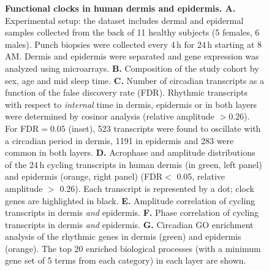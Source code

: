 {\begin{figure}
	\begin{center}
		\caption{\textbf{Functional clocks in human dermis and epidermis. A.} Experimental setup: the dataset includes dermal and epidermal samples collected from the back of 11 healthy subjects (5 females, 6 males). Punch biopsies were collected every 4\,h for 24\,h starting at 8\,AM. Dermis and epidermis were separated and gene expression was analyzed using microarrays.\textbf{ B. }Composition of the study cohort by sex, age and mid sleep time. \textbf{C. }Number of circadian transcripts as a function of the false discovery rate (FDR). Rhythmic transcripts with respect to \textit{internal} time in dermis, epidermis or in both layers were determined by cosinor analysis (relative amplitude $>0.26$). For FDR$=0.05$ (inset), 523 transcripts were found to oscillate with a circadian period in dermis, 1191 in epidermis and 283 were common in both layers. \textbf{D. }Acrophase and amplitude distributions of the 24\,h cycling transcripts in human dermis (in green, left panel) and epidermis (orange, right panel) (FDR$<$ 0.05, relative amplitude $>$ 0.26). Each transcript is represented by a dot; clock genes are highlighted in black. \textbf{E. }Amplitude correlation of cycling transcripts in dermis \textit{and} epidermis. \textbf{F. }Phase correlation of cycling transcripts in dermis \textit{and} epidermis. \textbf{G.} Circadian GO enrichment analysis of the rhythmic genes in dermis (green) and epidermis (orange). The top 20 enriched biological processes (with a minimum gene set of 5 terms from each category) in each layer are shown. } %
		\label{fig:fig1}
	\end{center}
\end{figure}


}

